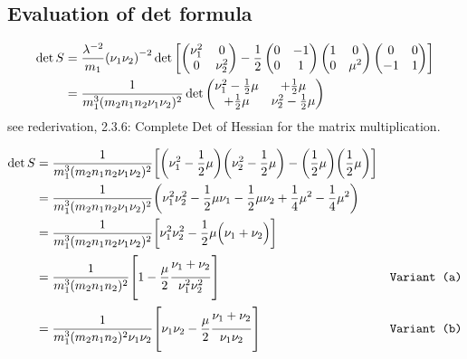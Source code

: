 \documentclass[
	english,
	a4paper,
	fontsize=10pt,
	parskip=half,
	titlepage=true,
	DIV=12,
	final
]{scrreprt}
\begin{document}
\subsection{Evaluation of det formula}

\begin{align}
	\det S
&=
	\frac{ \lambda^{-2} }{ m_1 }
	\qty( \nu_1 \nu_2 )^{-2}
	\det\qty[
		\begin{pmatrix}
			\nu_1^2 & 0 \\
			0 & \nu_2^2
		\end{pmatrix}
		-
		\frac{1}{2}
		\begin{pmatrix}
			 0 & -1 \\
			 0 &  1
		\end{pmatrix}
		\begin{pmatrix}
			1 & 0 \\
			0 & \mu^2
		\end{pmatrix}
		\begin{pmatrix}
			 0 &  0 \\
			-1 &  1
		\end{pmatrix}
	] \\
&=
	\frac{1}{m_1^3 (m_2 n_1 n_2 \nu_1 \nu_2)^2}
	\det \begin{pmatrix}
		\nu_1^2 - \frac{1}{2} \mu	& + \frac{1}{2} \mu \\
		+ \frac{1}{2} \mu 					& \nu_2^2 - \frac{1}{2} \mu
	\end{pmatrix}
\end{align}
see rederivation, 2.3.6: Complete Det of Hessian for the matrix multiplication.

\begin{align*}
	\det S
&=
	\frac{1}{m_1^3 (m_2 n_1 n_2 \nu_1 \nu_2)^2} \qty[
	\qty(\nu_1^2 - \frac{1}{2} \mu)
	\qty(\nu_2^2 - \frac{1}{2} \mu)
	-
	\qty(\frac{1}{2} \mu)
	\qty(\frac{1}{2} \mu) ] \\
&=
	\frac{1}{m_1^3 (m_2 n_1 n_2 \nu_1 \nu_2)^2}
	\qty(
		  \nu_1^2 \nu_2^2
		- \frac{1}{2} \mu \nu_1
		- \frac{1}{2} \mu \nu_2
		+ \frac{1}{4} \mu^2
		- \frac{1}{4} \mu^2
	) \\
&=
	\frac{1}{m_1^3 (m_2 n_1 n_2 \nu_1 \nu_2)^2}
	\qty[
		  \nu_1^2 \nu_2^2
		- \frac{1}{2} \mu \qty(\Big. \nu_1 + \nu_2)
	] \\
&=
	\frac{1}{m_1^3 (m_2 n_1 n_2)^2}
	\qty[
		  1
		- \frac{\mu}{2} \frac{\Big. \nu_1 + \nu_2}{\nu_1^2 \nu_2^2}
	]
	& \texttt{Variant (a)} \\
&=
	\frac{1}{m_1^3 (m_2 n_1 n_2)^2 \nu_1 \nu_2}
	\qty[
		  \nu_1 \nu_2
		- \frac{\mu}{2} \frac{\Big. \nu_1 + \nu_2}{\nu_1 \nu_2}
	]
	& \texttt{Variant (b)}
\end{align*}
\end{document}
